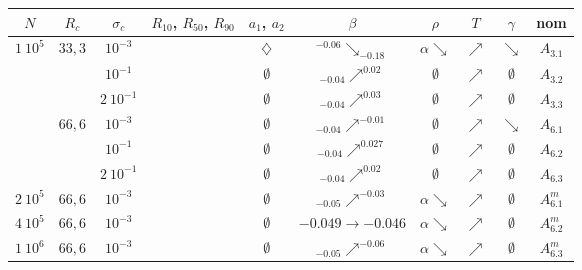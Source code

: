 \begin{table}[htbp]
	\centering
		\begin{tabular}{|c|c|c|c|c|c|c|c|c|c|}
			\hline $N$ & $R_c$ & $\sigma_c$ & $R_{10}$, $R_{50}$, $R_{90}$ & $a_1$, $a_2$ & $\beta$ & $\rho$ & $T$ & $\gamma$ & nom \tabularnewline
			\hline
			\hline \multirow{6}{*}{$1\ 10^5$} & \multirow{3}{*}{$33,3$}
			& $10^{-3}$ & \accretionmoyen{} & $\diamondsuit$ & ${}^{-0.06}\searrow_{-0.18}$ & $\alpha\searrow$ & $\nearrow$ & $\searrow$ & $A_{3.1}$ \tabularnewline \cline{3-10}
					& & $10^{-1}$ & \accretionpeu{} & $\emptyset$ & ${}_{-0.04}\nearrow^{0.02}$ & $\emptyset$ & $\nearrow$ & $\emptyset$ & $A_{3.2}$  \tabularnewline \cline{3-10}
					& & $2\ 10^{-1}$ & \accretionpeu{} & $\emptyset$ & ${}_{-0.04}\nearrow^{0.03}$ & $\emptyset$ & $\nearrow$ & $\emptyset$ & $A_{3.3}$  \tabularnewline \cline{2-10}
				& \multirow{3}{*}{$66,6$}
					& $10^{-3}$ & \accretionpeu{} & $\emptyset$ & ${}_{-0.04}\nearrow^{-0.01}$ & $\emptyset$ & $\nearrow$ & $\searrow$ & $A_{6.1}$  \tabularnewline \cline{3-10}
					& & $10^{-1}$ & \accretionpeu{} & $\emptyset$ & ${}_{-0.04}\nearrow^{0.027}$ & $\emptyset$ & $\nearrow$ & $\emptyset$ & $A_{6.2}$  \tabularnewline \cline{3-10}
					& & $2\ 10^{-1}$ & \accretionpeu{} & $\emptyset$ & ${}_{-0.04}\nearrow^{0.02}$ & $\emptyset$ & $\nearrow$ & $\emptyset$ & $A_{6.3}$  \tabularnewline \cline{2-10}
			\hline
			\hline $2\ 10^5$ & $66,6$ & $10^{-3}$ & \accretionpeu{} & $\emptyset$ & ${}_{-0.05}\nearrow^{-0.03}$ & $\alpha\searrow$ & $\nearrow$ & $\emptyset$ & $A_{6.1}^m$  \\
			\hline
			\hline $4\ 10^5$ & $66,6$ & $10^{-3}$ & \accretionpeu{} & $\emptyset$ & ${\scriptstyle -0.049}\to{\scriptstyle -0.046}$ & $\alpha\searrow$ & $\nearrow$ & $\emptyset$ & $A_{6.2}^m$  \\
			\hline
			\hline $1\ 10^6$ & $66,6$ & $10^{-3}$ & \accretionpeu{} & $\emptyset$ & ${}_{-0.05}\nearrow^{-0.06}$ & $\alpha\searrow$ & $\nearrow$ & $\emptyset$ & $A_{6.3}^m$  \\

\end{tabular}
\end{table}
